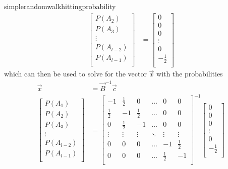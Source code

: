 \begin{answer}{simplerandomwalkhittingprobability}
\begin{align*}
\begin{bmatrix}
  P(A_2) \\
  P(A_3) \\
  \vdots \\
  P(A_{l-2}) \\
  P(A_{l-1}) \\
  \end{bmatrix}
  &=
  \begin{bmatrix}
    0 \\ 0 \\ 0 \\ \vdots \\ 0 \\ -\frac{1}{2} \\
  \end{bmatrix}
\end{align*}
which can then be used to solve for the vector $\vec{x}$ with the probabilities
\begin{align*}
\vec{x} &= \vec{B}^{-1}\vec{c} \\
  \begin{bmatrix}
  P(A_1) \\
  P(A_2) \\
  P(A_3) \\
  \vdots \\
  P(A_{l-2}) \\
  P(A_{l-1}) \\
  \end{bmatrix}
  &=
  \begin{bmatrix}
 -1           & \frac{1}{2}  & 0            &   \ldots       & 0            & 0            \\
 \frac{1}{2}  & -1           & \frac{1}{2}  &   \ldots       & 0            & 0            \\
 0            & \frac{1}{2}  & -1           &   \ldots       & 0            & 0            \\
  \vdots      & \vdots       & \vdots       &   \ddots       & \vdots       & \vdots       \\
 0            & 0            & 0            &   \ldots       & -1           & \frac{1}{2}  \\
 0            & 0            & 0            &   \ldots       & \frac{1}{2}  & -1           \\
  \end{bmatrix}^{-1}
  \begin{bmatrix}
    0 \\ 0 \\ 0 \\ \vdots \\ 0 \\ -\frac{1}{2} \\

\end{bmatrix}
\end{align*}
\end{answer}

